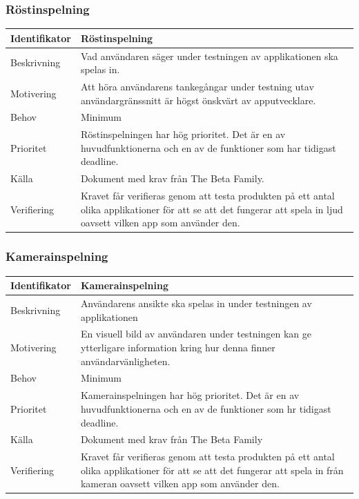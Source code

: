 \subsubsection{Röstinspelning}
\begin{tabular}{ | p{65pt} | p{300pt} |}
  \hline
  Identifikator &
Röstinspelning
  \\ \hline
  Beskrivning & 
  Vad användaren säger under testningen av applikationen ska spelas in.
  \\ \hline
  Motivering &
  Att höra användarens tankegångar under testning utav användargränssnitt är högst önskvärt av apputvecklare.
  \\ \hline
  Behov &
  Minimum
  \\ \hline
  Prioritet &
  Röstinspelningen har hög prioritet. Det är en av huvudfunktionerna och en av de funktioner som har tidigast deadline.
  \\ \hline
  Källa &
  Dokument med krav från The Beta Family.
  \\ \hline
  Verifiering &
  Kravet får verifieras genom att testa produkten på ett antal olika applikationer för att se att det fungerar att spela in ljud oavsett vilken app som använder den.
  \\ \hline
\end{tabular}

\subsubsection{Kamerainspelning}
\begin{tabular}{ | p{65pt} | p{300pt} |}
  \hline
  Identifikator &
  Kamerainspelning
  \\ \hline
  Beskrivning & 
  Användarens ansikte ska spelas in under testningen av applikationen
  \\ \hline
  Motivering &
  En visuell bild av användaren under testningen kan ge ytterligare information kring hur denna finner användarvänligheten.
  \\ \hline
  Behov &
  Minimum
  \\ \hline
  Prioritet &
  Kamerainspelningen har hög prioritet. Det är en av huvudfunktionerna och en av de funktioner som hr tidigast deadline.
  \\ \hline
  Källa &
  Dokument med krav från The Beta Family
  \\ \hline
  Verifiering &
  Kravet får verifieras genom att testa produkten på ett antal olika applikationer för att se att det fungerar att spela in från kameran oavsett vilken app som använder den.
  \\ \hline
\end{tabular}


